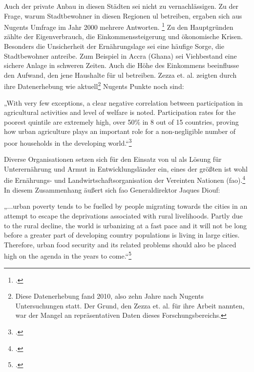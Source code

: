 \documentclass{scrartcl}
\begin{document}
Auch der private Anbau in diesen Städten sei nicht zu vernachlässigen. Zu der Frage, warum Stadtbewohner in diesen Regionen \acs{ul} betreiben, ergaben sich aus Nugents Umfrage im Jahr 2000 mehrere Antworten. \footcite[Vgl.][S.74]{Nugent2000TheEconomies} Zu den Hauptgründen zählte der Eigenverbrauch, die Einkommenssteigerung und ökonomische Krisen. Besonders die Unsicherheit der Ernährungslage sei eine häufige Sorge, die Stadtbewohner antreibe. Zum Beispiel in Accra (Ghana) sei Viehbestand eine sichere Anlage in schweren Zeiten. Auch die Höhe des Einkommens beeinflusse den Aufwand, den jene Haushalte für \acs{ul} betreiben. Zezza et. al. zeigten durch ihre Datenerhebung wie aktuell\footnote{Diese Datenerhebung fand 2010, also zehn Jahre nach Nugents Untersuchungen statt. Der Grund, den Zezza et. al. für ihre Arbeit nannten, war der Mangel an repräsentativen Daten dieses Forschungsbereichs.} Nugents Punkte noch sind:
\begin{displayquote}
„With very few exceptions, a clear negative correlation between participation in agricultural activities and level of welfare is noted. Participation rates for the poorest quintile are extremely high, over 50\% in 8 out of 15 countries, proving how urban agriculture plays an important role for a non-negligible number of poor households in the developing world.“\footcite[S.268]{Zezza2010UrbanCountries}
\end{displayquote}

Diverse Organisationen setzen sich für den Einsatz von \acs{ul} als Lösung für Unterernährung und Armut in Entwicklungsländer ein, eines der größten ist wohl die Ernährungs- und Landwirtschaftsorganisation der Vereinten Nationen (\acs{fao}).\footcite[Vgl.][S.6ff]{FAOAboutNations} In diesem Zusammenhang äußert sich \acs{fao} Generaldirektor Jaques Diouf:

\begin{displayquote}
„\lbrack...\rbrack urban poverty tends to be fuelled by people migrating towards the cities in an attempt to escape the deprivations associated with rural livelihoods. Partly due to the rural decline, the world is urbanizing at a fast pace and it will not be long before a greater part of developing country populations is living in large cities. Therefore, urban food security and its related problems should also be placed high on the agenda in the years to come.“\footcite[S.5f]{FoodandAgricultureOrganizationoftheUnitedNations2006The2006}
\end{displayquote}
\end{document}
